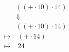 \documentclass{article}
\begin{document}
\tiny\begin{align*}
&\left(\left(+\cdot 10\right)\cdot 14\right)\\ 
&\Downarrow\\ 
&\left(\left(\mathtt{+}\cdot 10\right)\cdot 14\right)\\ 
\longmapsto &\;\left(\mathtt{+}\cdot 14\right)\\ 
\longmapsto &\;24\\ 
\end{align*}
\end{document}
